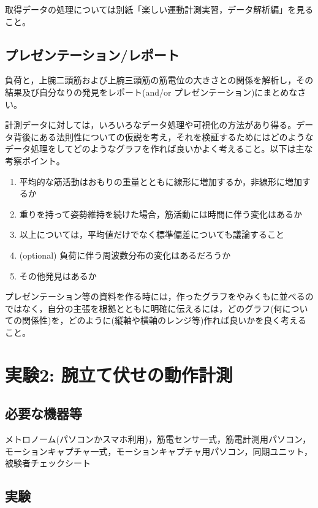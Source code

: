 \documentclass{jsarticle}
\begin{document}
取得データの処理については別紙「楽しい運動計測実習，データ解析編」を見ること。

\subsection{プレゼンテーション/レポート}

負荷と，上腕二頭筋および上腕三頭筋の筋電位の大きさとの関係を解析し，その結果及び自分なりの発見をレポート(and/or プレゼンテーション)にまとめなさい。

計測データに対しては，いろいろなデータ処理や可視化の方法があり得る。データ背後にある法則性についての仮説を考え，それを検証するためにはどのようなデータ処理をしてどのようなグラフを作れば良いかよく考えること。以下は主な考察ポイント。

\begin{enumerate}
  \item 平均的な筋活動はおもりの重量とともに線形に増加するか，非線形に増加するか
  \item 重りを持って姿勢維持を続けた場合，筋活動には時間に伴う変化はあるか
  \item 以上については，平均値だけでなく標準偏差についても議論すること
  \item (optional) 負荷に伴う周波数分布の変化はあるだろうか
  \item その他発見はあるか
\end{enumerate}

プレゼンテーション等の資料を作る時には，作ったグラフをやみくもに並べるのではなく，自分の主張を根拠とともに明確に伝えるには，どのグラフ(何についての関係性)を，どのように(縦軸や横軸のレンジ等)作れば良いかを良く考えること。


\section{実験2: 腕立て伏せの動作計測}

\subsection{必要な機器等}

メトロノーム(パソコンかスマホ利用)，筋電センサ一式，筋電計測用パソコン，モーションキャプチャ一式，モーションキャプチャ用パソコン，同期ユニット，被験者チェックシート

\subsection{実験}
\end{document}
